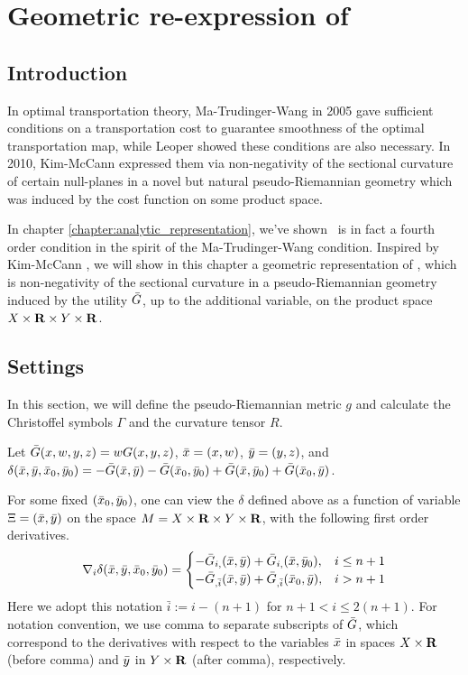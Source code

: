\chapter{Geometric re-expression of \Gthree}\label{chapter:geometry}

\section{Introduction}

In optimal transportation theory, Ma-Trudinger-Wang \cite{MaTrudingerWang05} in 2005 gave sufficient conditions on a transportation cost to guarantee smoothness of the optimal transportation map, while Leoper \cite{Loeper09} showed these conditions are also necessary. In 2010, Kim-McCann \cite{KimMcCann10} expressed them via non-negativity of the sectional curvature of certain null-planes in a novel but natural pseudo-Riemannian geometry which was induced by the cost function on some product space.\medskip

In chapter \ref{chapter:analytic_representation}, we've shown \Gthree~is in fact a fourth order condition in the spirit of the Ma-Trudinger-Wang condition. Inspired by Kim-McCann \cite{KimMcCann10}, we will show in this chapter a geometric representation of \Gthree, which is non-negativity of the sectional curvature in a pseudo-Riemannian geometry induced by the utility $\bar{G}$, up to the additional variable, on the product space $X\times {\mathbf R} \times Y \times {\mathbf R}$.\medskip

\section{Settings}\label{section:geometric_setting}

In this section, we will define the pseudo-Riemannian metric $g$ and calculate the Christoffel symbols $\Gamma$ and the curvature tensor $R$. \medskip

Let $\bar{G} (x,w, y,z) = w G(x,y,z)$, $\bar{x} = (x,w)$, $\bar{y} = (y,z)$, and $\delta(\bar{x}, \bar{y}, \bar{x}_{0}, \bar{y}_{0}) = -\bar{G} (\bar{x}, \bar{y}) -\bar{G}(\bar{x}_0, \bar{y}_0) +\bar{G}(\bar{x}, \bar{y}_0) + \bar{G}(\bar{x}_0, \bar{y})$.\medskip

For some fixed $(\bar{x}_0, \bar{y}_0)$, one can view the $\delta$ defined above as a function of variable $\Xi =(\bar{x}, \bar{y})$ on the space $M = X \times {\mathbf R} \times Y \times {\mathbf R}$, with the following first order derivatives.
\begin{equation}
	\nabla_i \delta (\bar{x}, \bar{y}, \bar{x}_0, \bar{y}_0) = \begin{cases}
	-\bar{G}_{i,}(\bar{x}, \bar{y}) + \bar{G}_{i,}(\bar{x}, \bar{y}_0) , & i\le n+1\\
	-\bar{G}_{,\bar{i}}(\bar{x}, \bar{y}) + \bar{G}_{,\bar{i}}(\bar{x}_0, \bar{y}), & i> n+1 \\
	\end{cases}
\end{equation}
Here we adopt this notation $\bar{i}:= i-(n+1)$ for $n+1 <i\le 2(n+1)$. For notation convention, we use comma to separate subscripts of $\bar{G}$, which correspond to the derivatives with respect to the variables $\bar{x}$ in spaces $X \times {\mathbf R}$ (before comma) and $\bar{y}$ in $Y \times {\mathbf R}$ (after comma), respectively.\medskip

